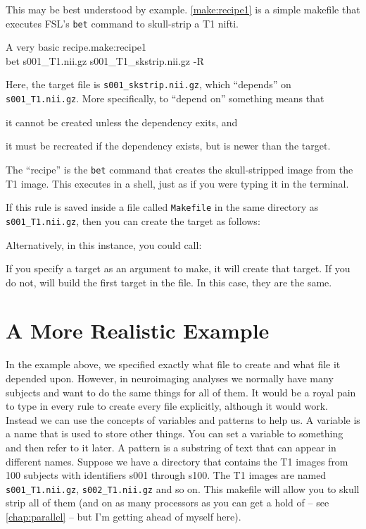 This may be best understood by example. \autoref{make:recipe1} is a simple makefile that executes FSL's \texttt{bet} command to skull-strip a T1 nifti.
	
\begin{make}{A very basic \maken{} recipe.}{make:recipe1}
	 \\
	\tab bet s001_T1.nii.gz s001_T1_skstrip.nii.gz -R
\end{make}
	
Here, the target file is \texttt{s001_skstrip.nii.gz}, which ``depends'' on \texttt{s001_T1.nii.gz}. More specifically, to ``depend on'' something means that \begin{inparaenum} \item it cannot be created unless the dependency exits, and \item it must be recreated if the dependency exists, but is newer than the target. \end{inparaenum}
	
The ``recipe'' is the \texttt{bet} command that creates the skull-stripped image from the T1 image. This executes in a shell, just as if you were typing it in the terminal.
	
If this rule is saved inside a file called \texttt{Makefile} in the same directory as \texttt{s001_T1.nii.gz}, then you can create the target as follows:	
	
Alternatively, in this instance, you could call:
	
If you specify a target as an argument to make, it will create that target. If you do not, \maken{} will build the first target in the file. In this case, they are the same.
	
\section{A More Realistic Example}
	
In the example above, we specified exactly what file to create and what file it depended upon. However, in neuroimaging analyses we normally have many subjects and want to do the same things for all of them. It would be a royal pain to type in every rule to create every file explicitly, although it would work. Instead we can use the concepts of variables and patterns to help us. 
A variable is a name that is used to store other things. You can set a variable to something and then refer to it later. A pattern is a substring of text that can appear in different names.
Suppose we have a directory that contains the T1 images from 100 subjects with identifiers s001 through s100. The T1 images are named \texttt{s001_T1.nii.gz}, \texttt{s002_T1.nii.gz} and so on. This makefile will allow you to skull strip all of them (and on as many processors as you can get a hold of -- see \autoref{chap:parallel} -- but I'm getting ahead of myself here).
	
